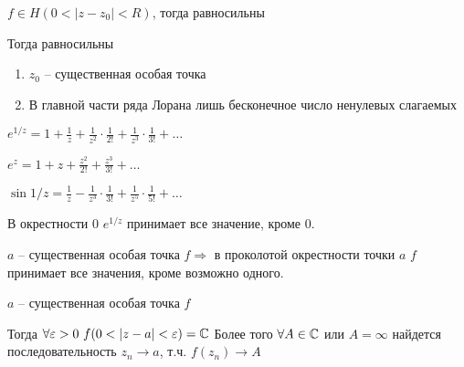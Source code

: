 \begin{theorem}\thmslashn
	
	$f \in H(0 < |z -z_0| < R)$, тогда равносильны 
	
	Тогда равносильны 
	
	\begin{enumerate}
		\item 
		$z_0$ -- существенная особая точка
		
		\item
		В главной части ряда Лорана лишь бесконечное число ненулевых слагаемых
	\end{enumerate}

\end{theorem}

\begin{example}\thmslashn
	
	$e^{1/z} = 1 + \frac{1}{z} + \frac{1}{z^2}\cdot\frac{1}{2!} + \frac{1}{z^3}\cdot\frac{1}{3!} + \ldots$

	$e^{z} = 1 + z + \frac{z^2}{2!} + \frac{z^3}{3!} + \ldots$
	
	$\sin{1/z} = \frac{1}{z} - \frac{1}{z^3}\cdot\frac{1}{3!} + \frac{1}{z^5}\cdot\frac{1}{5!} + \ldots$
	
\end{example}

\begin{remark}\thmslashn
	
	В окрестности $0$ $e^{1/z}$ принимает все значение, кроме $0$.
	
\end{remark}

\begin{theorem}[Пикара]\thmslashn
	
	$a$ -- существенная особая точка $f \Rightarrow$ в проколотой окрестности точки $a$ $f$ принимает все значения, кроме возможно одного.
	
\end{theorem}

\begin{theorem}[Сохоцкого]\thmslashn
	
	$a$ -- существенная особая точка $f$
	
	Тогда $\forall \varepsilon > 0\,\,f ( 0< |z - a| < \varepsilon) = \mathbb{C}$ Более того $\forall A \in \mathbb{C}$ или $A = \infty$ найдется последовательность $z_n \to a$, т.ч. $f(z_n) \to A$
	
\end{theorem}

